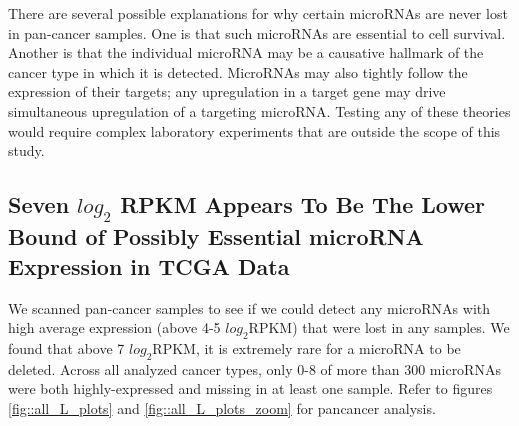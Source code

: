 \documentclass[12pt]{report}
\begin{document}
  There are several possible explanations for why certain microRNAs are never lost in pan-cancer samples. One is that such microRNAs are essential to cell
  survival. Another is that the individual microRNA may be a causative hallmark of the cancer type in which it is detected. MicroRNAs may also tightly follow the
  expression of their targets; any upregulation in a target gene may drive simultaneous upregulation of a targeting microRNA. Testing any of these theories would
  require complex laboratory experiments that are outside the scope of this study.
  
  
\subsection*{Seven $log_{2}$ RPKM Appears To Be The Lower Bound of Possibly Essential microRNA Expression in TCGA Data}
  We scanned pan-cancer samples to see if we could detect any microRNAs with high average expression (above 4-5 $log_{2} \text{RPKM}$) that were lost in any samples. We found that 
  above 7 $log_{2} \text{RPKM}$, it is extremely rare for a microRNA to be deleted. Across all analyzed cancer types, only 0-8 of more than 300 microRNAs were both highly-expressed and missing in at least one sample.
  Refer to figures \ref{fig::all_L_plots} and \ref{fig::all_L_plots_zoom} for pancancer analysis.
\end{document}
